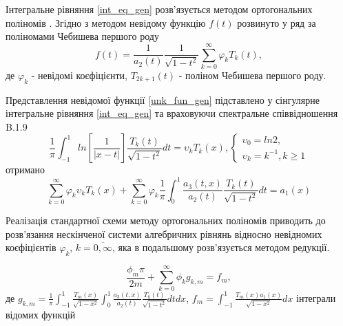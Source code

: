 Інтегральне рівняння \eqref{int_eq_gen} розв'язується методом ортогональних поліномів \cite{popov_3}.
Згідно з методом невідому функцію $f(t)$ розвинуто у ряд за поліномами Чебишева першого роду
\begin{equation}\label{unk_fun_gen}
    f(t) = \frac{1}{a_2(t)} \frac{1}{\sqrt{1 - t^2}} \sum_{k=0}^{\infty} \varphi_k T_{k}(t),
\end{equation}
де $\varphi_k$ - невідомі коєфіцієнти, $T_{2k + 1}(t)$ - поліном Чебишева першого роду.

Представлення невідомої функції \eqref{unk_fun_gen} підставлено у сінгулярне інтегральне рівняння \eqref{int_eq_gen}
та враховуючи спектральне співвідношення B.1.9 \cite{ortogonal}
\begin{equation}
    \frac{1}{\pi} \int_{-1}^{1} ln\left[ \frac{1}{\lvert x - t \rvert} \right] \frac{T_k(t)}{\sqrt{1 - t^2}} dt = \upsilon_k T_k(x),
    \begin{cases}
        \upsilon_0 = ln 2, \\
        \upsilon_k = k^{-1}, k \ge 1
    \end{cases}
\end{equation} 
отримано
\begin{equation}\label{int_eq_2_gen}
    \sum_{k=0}^{\infty}  \varphi_k \upsilon_k T_{k}( x ) + \sum_{k=0}^{\infty} \varphi_k \frac{1}{\pi} \int_{0}^{1} \frac{a_3(t, x)}{a_2(t)} \frac{T_{k}(t)}{\sqrt{1 - t^2}} dt = a_1(x)
\end{equation}

Реалізація стандартної схеми методу ортогональних поліномів приводить до розв'язання нескінченої системи алгебричних рівнянь відносно невідномих коєфіцієнтів $\varphi_k$, $k=\overline{0, \infty}$,
яка в подальшому розв'язується методом редукції.

\begin{equation}\label{int_system_gen}
    \frac{\phi_m \pi}{2m} + \sum_{k=0}^{\infty} \phi_k g_{k, m} = f_m,
\end{equation}
де $g_{k, m} = \frac{1}{\pi} \int_{-1}^{1} \frac{T_{m}(x)}{\sqrt{1 - x^2}} \int_{0}^{1} \frac{a_3(t, x )}{a_2(t)} \frac{T_{k}(t)}{\sqrt{1 - t^2}} dt dx$,
$f_m = \int_{-1}^{1} \frac{T_{m}(x) a_1(x)}{\sqrt{1 - x^2}} dx$ інтеграли відомих функцій



